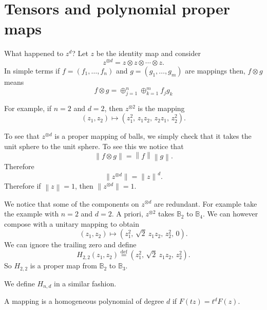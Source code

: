 \documentclass[12pt,openany]{book}
\newcommand{\norm}[1]{\left\lVert {#1} \right\rVert}
\newcommand{\bB}{{\mathbb{B}}}
\newcommand{\sectionnewpage}{}
\theoremstyle{plain}
\theoremstyle{remark}
\theoremstyle{definition}
\theoremstyle{exercise}
\theoremstyle{example}
\begin{document}
\sectionnewpage
\section{Tensors and polynomial proper maps}

What happened to $z^d$?  Let $z$ be the identity map and consider
\begin{equation}
z^{\otimes d} =  z \otimes z \otimes \cdots \otimes z .
\end{equation}
In simple terms if $f = (f_1,\ldots,f_n)$
and $g=(g_1,\ldots,g_m)$ are mappings then,
$f \otimes g$ means
\begin{equation}
f \otimes g = \oplus_{j=1}^n \oplus_{k=1}^m f_j g_k
\end{equation}

For example, if $n=2$ and $d=2$, then $z^{\otimes 2}$
is the mapping
\begin{equation}
(z_1,z_2) \mapsto
(z_1^2, \, z_1z_2, \, z_2z_1, \, z_2^2) .
\end{equation}

To see that $z^{\otimes d}$ is a proper mapping of balls, we simply check
that
it takes the unit sphere to the unit sphere.
To see this we notice that
\begin{equation}
\norm{ f \otimes g } =
\norm{f} \norm{g} .
\end{equation}
Therefore
\begin{equation}
\lVert z^{\otimes d} \rVert = 
{\lVert z \rVert}^d .
\end{equation}
Therefore if $\norm{z} = 1$, then 
$\lVert z^{\otimes d} \rVert = 1$.

We notice that some of the components on $z^{\otimes d}$ are redundant.
For example take the example with $n=2$ and $d=2$.  A priori,
$z^{\otimes 2}$ takes $\bB_2$ to $\bB_4$.  We can however compose with 
a unitary mapping to obtain
\begin{equation}
(z_1,z_2) \mapsto
(z_1^2, \, \sqrt{2}~z_1z_2 , \, z_2^2, \, 0) .
\end{equation}
We can ignore the trailing zero and define
\begin{equation}
H_{2,2} (z_1,z_2) \overset{\mathrm{def}}{=} (z_1^2, \, \sqrt{2}~z_1z_2, \, z_2^2) .
\end{equation}
So $H_{2,2}$ is a proper map from $\bB_2$ to $\bB_3$.

We define $H_{n,d}$ in a similar fashion.

A mapping is a homogeneous polynomial of degree $d$ if $F(tz) = t^d F(z)$.
\end{document}
